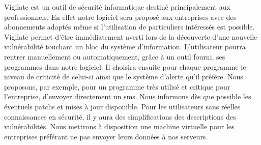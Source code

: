 Vigilate est un outil de sécurité informatique destiné principalement aux professionnels. En effet notre logiciel sera proposé aux entreprises avec des abonnements adaptés même si l’utilisation de particuliers intéressés est possible. Vigilate permet d’être immédiatement averti lors de la découverte d’une nouvelle vulnérabilité touchant un bloc du système d’information. L’utilisateur pourra rentrer manuellement ou automatiquement, grâce à un outil fourni, ses programmes dans notre logiciel. Il choisira ensuite pour chaque programme le niveau de criticité de celui-ci ainsi que le système d’alerte qu’il préfère. Nous proposons, par exemple, pour un programme très utilisé et critique pour l’entreprise, d’envoyer directement un sms. Nous informons dès que possible les éventuels patchs et mises à jour disponible. Pour les utilisateurs sans réelles connaissances en sécurité, il y aura des simplifications des descriptions des vulnérabilités. Nous mettrons à disposition une machine virtuelle pour les entreprises préférant ne pas envoyer leurs données à nos serveurs.
